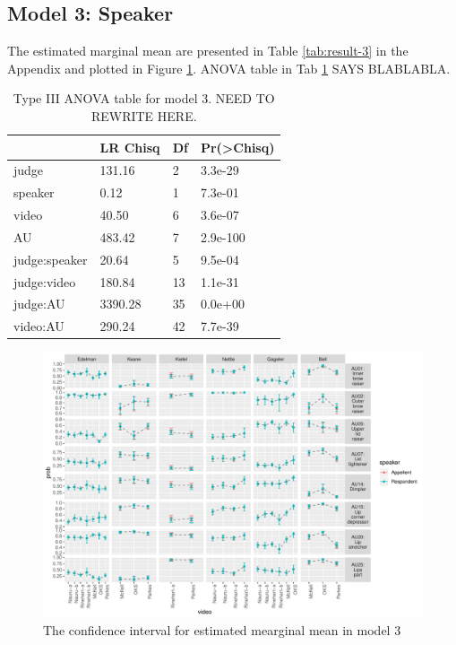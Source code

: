 \documentclass{monashthesis}
\begin{document}
\hypertarget{model-3-speaker-1}{%
\subsection{Model 3: Speaker}\label{model-3-speaker-1}}

The estimated marginal mean are presented in Table \ref{tab:result-3} in the Appendix and plotted in Figure \ref{fig:model3-plot}. ANOVA table in Tab \ref{tab:anova-3} SAYS BLABLABLA.

\begin{table}

\caption{\label{tab:anova-3}\label{tab:anova-3}Type III ANOVA table for model 3. NEED TO REWRITE HERE.}
\centering
\begin{tabular}[t]{l|l|l|l}
\hline
  & LR Chisq & Df & Pr(>Chisq)\\
\hline
judge & 131.16 & 2 & 3.3e-29\\
\hline
speaker & 0.12 & 1 & 7.3e-01\\
\hline
video & 40.50 & 6 & 3.6e-07\\
\hline
AU & 483.42 & 7 & 2.9e-100\\
\hline
judge:speaker & 20.64 & 5 & 9.5e-04\\
\hline
judge:video & 180.84 & 13 & 1.1e-31\\
\hline
judge:AU & 3390.28 & 35 & 0.0e+00\\
\hline
video:AU & 290.24 & 42 & 7.7e-39\\
\hline
\end{tabular}
\end{table}

\begin{figure}

{\centering \includegraphics[width=1\linewidth]{figures/model3-plot-1} 

}

\caption{The confidence interval for estimated mearginal mean in model 3}\label{fig:model3-plot}
\end{figure}
\end{document}
